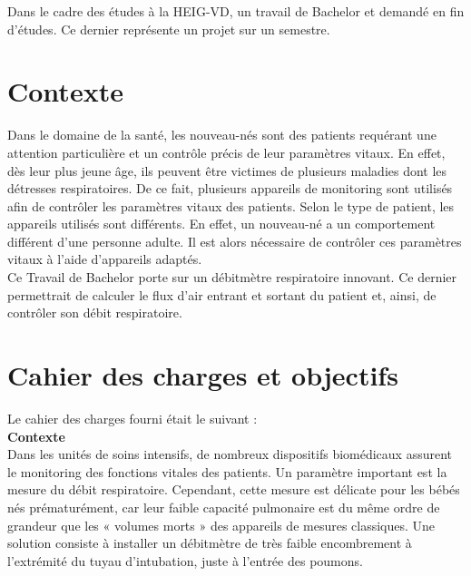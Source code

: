 Dans le cadre des études à la HEIG-VD, un travail de Bachelor et demandé en fin d'études. Ce dernier représente un projet sur un semestre. 

\section{Contexte}
Dans le domaine de la santé, les nouveau-nés sont des patients requérant une attention particulière et un contrôle précis de leur 
paramètres vitaux. En effet, dès leur plus jeune âge, ils peuvent être victimes de plusieurs maladies dont les détresses respiratoires. 
De ce fait, plusieurs appareils de monitoring sont utilisés afin de contrôler les paramètres vitaux des patients. 
Selon le type de patient, les appareils utilisés sont différents. En effet, un nouveau-né a un comportement différent d'une personne 
adulte. Il est alors nécessaire de contrôler ces paramètres vitaux à l'aide d'appareils adaptés. \\

Ce Travail de Bachelor porte sur un débitmètre respiratoire innovant. Ce dernier permettrait de calculer le flux d'air entrant et sortant
du patient et, ainsi, de contrôler son débit respiratoire. 

\section{Cahier des charges et objectifs}
Le cahier des charges fourni était le suivant :\\
\textbf{Contexte}\\
Dans les unités de soins intensifs, de nombreux dispositifs biomédicaux assurent le monitoring des fonctions vitales des patients. Un 
paramètre important est la mesure du débit respiratoire. Cependant, cette mesure est délicate pour les bébés nés prématurément, car leur 
faible capacité pulmonaire est du même ordre de grandeur que les « volumes morts » des appareils de mesures classiques. Une solution 
consiste à installer un débitmètre de très faible encombrement à l’extrémité du tuyau d’intubation, juste à l’entrée des poumons.

